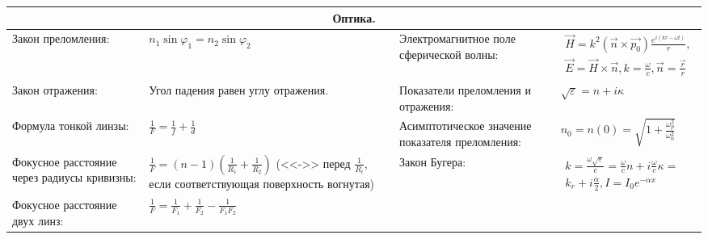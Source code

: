 \documentclass{article}
\begin{document}
\begin{tabular}{ |p{4.1cm}|p{5.4cm}|p{4.1cm}|p{4.4cm}|  }
\hline
\multicolumn{4}{|c|}{Оптика.} \\
\hline
Закон преломления:                                                           &  %
$n_1 \sin{\varphi_1} = n_2 \sin{\varphi_2}$                                  &  %
Электромагнитное поле сферической волны:                                     &  %
$\begin{aligned}
\vec{H} = k^2 (\vec{n} \times \vec{p_0}) \frac{e^{i(kr - \omega t)}}{r}, \\
\vec{E} = \vec{H} \times \vec{n}, k = \frac{\omega}{c},
\vec{n} = \frac{\vec{r}}{r}
\end{aligned}$                                                               \\ %
\hline
Закон отражения:                                                             &  %
Угол падения равен углу отражения.                                           &  %
Показатели преломления и отражения:                                          &  %
$\sqrt{\varepsilon} = n + i\kappa$                                           \\ %
\hline
Формула тонкой линзы:                                                        &  %
$\frac{1}{F} = \frac{1}{f} + \frac{1}{d}$                                    &  %
Асимптотическое значение показателя преломления:                             &  %
$n_0 = n(0) = \sqrt{1 + \frac{\omega_p^2}{\omega_0^2}}$                      \\ %
\hline
Фокусное расстояние через радиусы кривизны:                                  &  %
$\frac{1}{F} = (n-1)(\frac{1}{R_1} + \frac{1}{R_2})$ (<<->> перед
$\frac{1}{R_i}$, если соответствующая поверхность вогнутая)                  &  %
Закон Бугера:                                                                &  %
$\begin{aligned}
k = \frac{\omega \sqrt{\varepsilon}}{c} =
 \frac{\omega}{c}n + i \frac{\omega}{c} \kappa =    \\
 k_r + i \frac{\alpha}{2},
I = I_0 e^{-\alpha x}
\end{aligned}$                                                                             \\ %
\hline
Фокусное расстояние двух линз:                                               &  %
$\frac{1}{F} = \frac{1}{F_1} + \frac{1}{F_2} - \frac{1}{F_1 F_2}$            &  %

\end{tabular}
\end{document}
